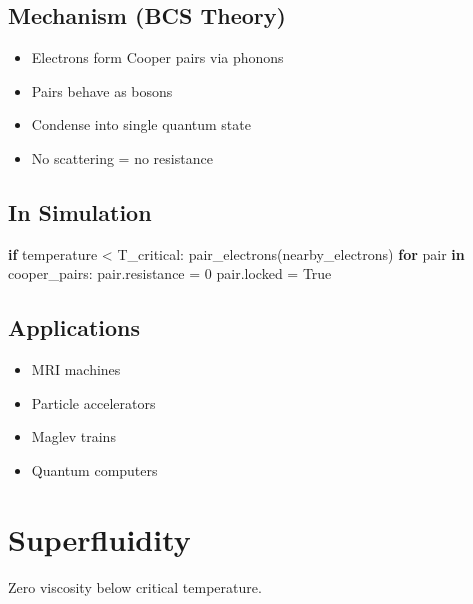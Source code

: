 \documentclass[
  11pt,
  letterpaper,
  twoside,
  openright]{book}
\newenvironment{Shaded}{\begin{snugshade}}{\end{snugshade}}
\newcommand{\ControlFlowTok}[1]{\textcolor[rgb]{0.00,0.23,0.31}{\textbf{#1}}}
\newcommand{\DecValTok}[1]{\textcolor[rgb]{0.68,0.00,0.00}{#1}}
\newcommand{\KeywordTok}[1]{\textcolor[rgb]{0.00,0.23,0.31}{\textbf{#1}}}
\newcommand{\NormalTok}[1]{\textcolor[rgb]{0.00,0.23,0.31}{#1}}
\newcommand{\OperatorTok}[1]{\textcolor[rgb]{0.37,0.37,0.37}{#1}}
\newcommand{\VariableTok}[1]{\textcolor[rgb]{0.07,0.07,0.07}{#1}}
\providecommand{\tightlist}{%
  \setlength{\itemsep}{0pt}\setlength{\parskip}{0pt}}
\begin{document}
\subsection{Mechanism (BCS Theory)}\label{mechanism-bcs-theory}

\begin{itemize}
\tightlist
\item
  Electrons form Cooper pairs via phonons
\item
  Pairs behave as bosons
\item
  Condense into single quantum state
\item
  No scattering = no resistance
\end{itemize}

\subsection{In Simulation}\label{in-simulation}

\begin{Shaded}
\begin{Highlighting}[]
\ControlFlowTok{if}\NormalTok{ temperature }\OperatorTok{\textless{}}\NormalTok{ T\_critical:}
\NormalTok{    pair\_electrons(nearby\_electrons)}
    \ControlFlowTok{for}\NormalTok{ pair }\KeywordTok{in}\NormalTok{ cooper\_pairs:}
\NormalTok{        pair.resistance }\OperatorTok{=} \DecValTok{0}
\NormalTok{        pair.locked }\OperatorTok{=} \VariableTok{True}
\end{Highlighting}
\end{Shaded}

\subsection{Applications}\label{applications}

\begin{itemize}
\tightlist
\item
  MRI machines
\item
  Particle accelerators
\item
  Maglev trains
\item
  Quantum computers
\end{itemize}

\section{Superfluidity}\label{superfluidity}

Zero viscosity below critical temperature.
\end{document}
